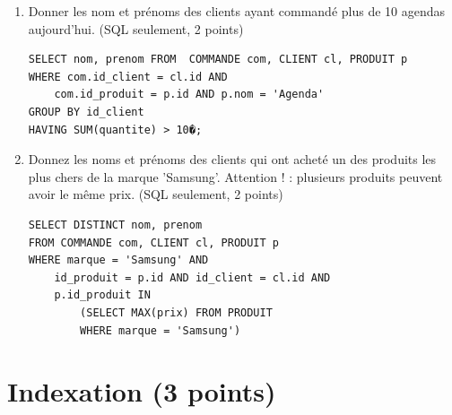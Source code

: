 \begin{enumerate}
\item Donner les nom et pr\'enoms des clients ayant command\'e plus de 10 agendas aujourd'hui. (SQL seulement, 2 points)
\begin{correction}
\begin{lstlisting}
SELECT nom, prenom FROM  COMMANDE com, CLIENT cl, PRODUIT p
WHERE com.id_client = cl.id AND 
	com.id_produit = p.id AND p.nom = 'Agenda'
GROUP BY id_client
HAVING SUM(quantite) > 10�;
\end{lstlisting}
\end{correction}

\item Donnez les noms et pr\'enoms des clients qui ont achet\'e un des produits les plus chers de la marque 'Samsung'. Attention ! : plusieurs produits peuvent avoir le m\^eme prix. (SQL seulement, 2 points)
\begin{correction}
\begin{lstlisting}
SELECT DISTINCT nom, prenom
FROM COMMANDE com, CLIENT cl, PRODUIT p
WHERE marque = 'Samsung' AND
	id_produit = p.id AND id_client = cl.id AND
	p.id_produit IN 
		(SELECT MAX(prix) FROM PRODUIT 
		WHERE marque = 'Samsung')
\end{lstlisting}
\end{correction}
\end{enumerate}

\section{Indexation (3 points)}

